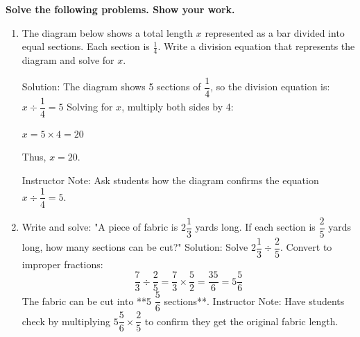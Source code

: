 \documentclass[12pt]{article}
\begin{document}
\begin{tcolorbox}[colframe=black!60, colback=white, 
coltitle=black, colbacktitle=black!15, fonttitle=\bfseries\Large, 
title=Problems Continued, halign title=center, left=5pt, right=10pt, top=10pt, bottom=10pt]
\textbf{Solve the following problems. Show your work.}


\begin{enumerate}
    \item \small The diagram below shows a total length \( x \) represented as a bar divided into equal sections. Each section is $ \frac{1}{4} $. Write a division equation that represents the diagram and solve for \( x \).

    \begin{center}
    \end{center}

        {\color{red} Solution: The diagram shows 5 sections of \( \dfrac{1}{4} \), so the division equation is:  
       $ 
        x \div \dfrac{1}{4} = 5
        $
                Solving for \( x \), multiply both sides by 4:
    
        $x = 5 \times 4 = 20$
        
        Thus, $ x = 20$.}  
        {\color{blue} Instructor Note: Ask students how the diagram confirms the equation \( x \div \dfrac{1}{4} = 5 \).}

    \item Write and solve: "A piece of fabric is \( 2 \dfrac{1}{3} \) yards long. If each section is \( \dfrac{2}{5} \) yards long, how many sections can be cut?"  
        {\color{red} Solution: Solve \( 2 \dfrac{1}{3} \div \dfrac{2}{5} \). Convert to improper fractions:  
        \[
        \dfrac{7}{3} \div \dfrac{2}{5} = \dfrac{7}{3} \times \dfrac{5}{2} = \dfrac{35}{6} = 5 \dfrac{5}{6}
        \]
        The fabric can be cut into **5 \(\dfrac{5}{6}\) sections**.}  
        {\color{blue} Instructor Note: Have students check by multiplying \( 5 \dfrac{5}{6} \times \dfrac{2}{5} \) to confirm they get the original fabric length.}
\end{enumerate}
\end{tcolorbox}
\end{document}

